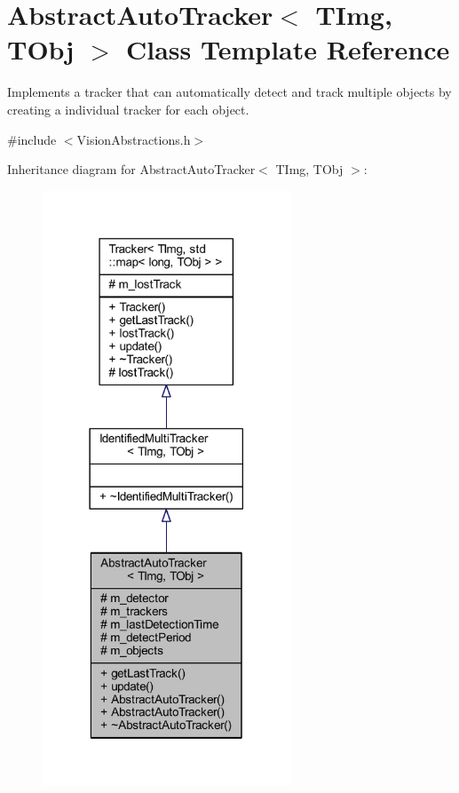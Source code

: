 \hypertarget{class_vision_core_1_1_abstractions_1_1_abstract_auto_tracker}{}\section{Abstract\+Auto\+Tracker$<$ T\+Img, T\+Obj $>$ Class Template Reference}
\label{class_vision_core_1_1_abstractions_1_1_abstract_auto_tracker}


Implements a tracker that can automatically detect and track multiple objects by creating a individual tracker for each object.  




{\ttfamily \#include $<$Vision\+Abstractions.\+h$>$}



Inheritance diagram for Abstract\+Auto\+Tracker$<$ T\+Img, T\+Obj $>$\+:
\nopagebreak
\begin{figure}[H]
\begin{center}
\leavevmode
\includegraphics[width=209pt]{class_vision_core_1_1_abstractions_1_1_abstract_auto_tracker__inherit__graph}
\end{center}
\end{figure}



